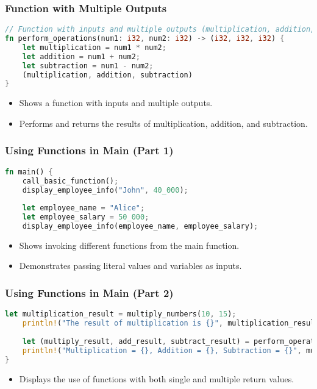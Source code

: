 \documentclass[aspectratio=169, table]{beamer}
\begin{document}
\begin{frame}[fragile]
\frametitle{Function with Multiple Outputs}
\begin{lstlisting}[language=Rust]
// Function with inputs and multiple outputs (multiplication, addition, subtraction)
fn perform_operations(num1: i32, num2: i32) -> (i32, i32, i32) {
	let multiplication = num1 * num2;
	let addition = num1 + num2;
	let subtraction = num1 - num2;
	(multiplication, addition, subtraction)
}
\end{lstlisting}
\begin{itemize}
\item Shows a function with inputs and multiple outputs.
\item Performs and returns the results of multiplication, addition, and subtraction.
\end{itemize}
\end{frame}

\begin{frame}[fragile]
\frametitle{Using Functions in Main (Part 1)}
\begin{lstlisting}[language=Rust]
fn main() {
	call_basic_function(); 
	display_employee_info("John", 40_000); 
	
	let employee_name = "Alice";
	let employee_salary = 50_000;
	display_employee_info(employee_name, employee_salary); 
\end{lstlisting}
\begin{itemize}
\item Shows invoking different functions from the main function.
\item Demonstrates passing literal values and variables as inputs.
\end{itemize}
\end{frame}

\begin{frame}[fragile]
\frametitle{Using Functions in Main (Part 2)}
\begin{lstlisting}[language=Rust]
	let multiplication_result = multiply_numbers(10, 15);
	println!("The result of multiplication is {}", multiplication_result);
	
	let (multiply_result, add_result, subtract_result) = perform_operations(10, 15);
	println!("Multiplication = {}, Addition = {}, Subtraction = {}", multiply_result, add_result, subtract_result);
}
\end{lstlisting}
\begin{itemize}
\item Displays the use of functions with both single and multiple return values.
\end{itemize}
\end{frame}
\end{document}
